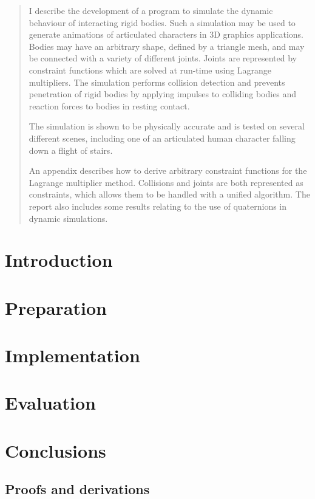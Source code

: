 \documentclass[11pt,a4paper,twoside,notitlepage]{report}
\begin{document}
\setcounter{page}{3}
\begin{abstract}
I describe the development of a program to simulate the dynamic behaviour
of interacting rigid bodies. Such a simulation may be used to generate animations
of articulated characters in 3D graphics applications. Bodies may have an
arbitrary shape, defined by a triangle mesh, and may be connected with a variety
of different joints. Joints are represented by constraint functions which are
solved at run-time using Lagrange multipliers. The simulation performs collision
detection and prevents penetration of rigid bodies by applying impulses to
colliding bodies and reaction forces to bodies in resting contact.

The simulation is shown to be physically accurate and is tested on several
different scenes, including one of an articulated human character falling down a flight
of stairs.

An appendix describes how to derive arbitrary constraint functions for the Lagrange
multiplier method. Collisions and joints are both represented as constraints, which
allows them to be handled with a unified algorithm. The report also includes some
results relating to the use of quaternions in dynamic simulations.
\end{abstract}
\tableofcontents
\chapter{Introduction}

\chapter{Preparation}




\chapter{Implementation}


\chapter{Evaluation}


\chapter{Conclusions}

\begin{appendix}

\chapter{Proofs and derivations}




\newpage{}

\end{appendix}
\end{document}
